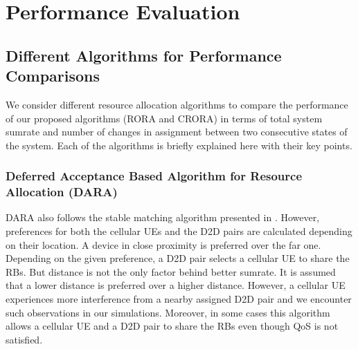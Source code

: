 \documentclass[times]{dacauth}
\begin{document}
\section{Performance Evaluation}\label{section:Performation Evaluation}
\subsection{Different Algorithms for Performance Comparisons}
\noindent
We consider different resource allocation algorithms to compare the performance of our proposed algorithms (RORA and CRORA) in terms of total system sumrate and number of changes in assignment between two consecutive states of the system. Each of the algorithms is briefly explained here with their key points.

\subsubsection{Deferred Acceptance Based Algorithm for Resource Allocation (DARA)}
\noindent
DARA \cite{dara} also follows the stable matching algorithm presented in \cite{stable}. However, preferences for both the cellular UEs and the D2D pairs are calculated depending on their location. A device in close proximity is preferred over the far one. Depending on the given preference, a D2D pair selects a cellular UE to share the RBs. But distance is not the only factor behind better sumrate. It is assumed that a lower distance is preferred over a higher distance. However, a cellular UE experiences more interference from a nearby assigned D2D pair and we encounter such observations in our simulations. Moreover, in some cases this algorithm allows a cellular UE and a D2D pair to share the RBs even though QoS is not satisfied.

\end{document}
